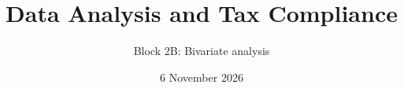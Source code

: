 \documentclass[11pt,aspectratio=169]{beamer}
\title{Data Analysis and Tax Compliance}
\subtitle{Block 2B: Bivariate analysis}
\date{6 November 2026}
\begin{document}
\begin{frame}\titlepage\end{frame}

\end{document}
